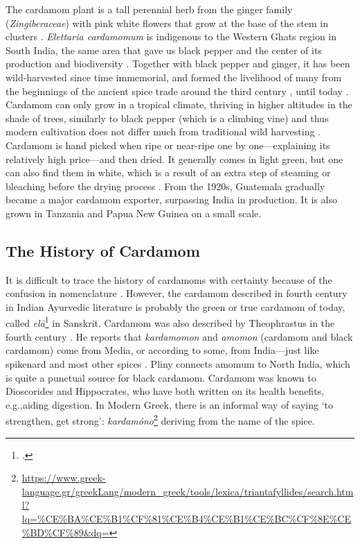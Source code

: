 The cardamom plant is a tall perennial herb from the ginger family (\textit{Zingiberaceae}) with pink white flowers that grow at the base of the stem in clusters \autocite[132]{van_wyk_culinary_2014}. \textit{Elettaria cardamomum} is indigenous to the Western Ghats region in South India, the same area that gave us black pepper and the center of its production and biodiversity \autocite[1]{ravindran_cardamom_2002}. Together with black pepper and ginger, it has been wild-harvested since time immemorial, and formed the livelihood of many from the beginnings of the ancient spice trade around the third century \BC{}, until today \autocite[132]{van_wyk_culinary_2014}. Cardamom can only grow in a tropical climate, thriving in higher altitudes in the shade of trees, similarly to black pepper (which is a climbing vine) and thus modern cultivation does not differ much from traditional wild harvesting \autocite[132]{van_wyk_culinary_2014}. Cardamom is hand picked when ripe or near-ripe one by one---explaining its relatively high price---and then dried. It generally comes in light green, but one can also find them in white, which is a result of an extra step of steaming or bleaching before the drying process \autocite[132]{van_wyk_culinary_2014}. From the 1920s, Guatemala gradually became a major cardamom exporter, surpassing India in production. It is also grown in Tanzania and Papua New Guinea on a small scale.

\subsection{The History of Cardamom}

It is difficult to trace the history of cardamoms with certainty because of the confusion in nomenclature \autocite{cumo_encyclopedia_2013}. However, the cardamom described in fourth century \BC{} in Indian Ayurvedic literature is probably the green or true cardamom of today, called \textit{el\={a}}\footcite[232]{monier-williams_sanskrit-english_1899} in Sanskrit. Cardamom was also described by Theophrastus in the fourth century \BC{}. He reports that \textit{kardamomon} and \textit{amomon} (cardamom and black cardamom) come from Media, or according to some, from India---just like spikenard and most other spices \autocite[249]{theophrastus_enquiry_1916}. Pliny connects amomum to North India, which is quite a punctual source for black cardamom. Cardamom was known to Dioscorides and Hippocrates, who have both written on its health benefits, e.g.,aiding digestion. In Modern Greek, there is an informal way of saying `to strengthen, get strong':  \textit{kardamóno}\footnote{\url{https://www.greek-language.gr/greekLang/modern_greek/tools/lexica/triantafyllides/search.html?lq=\%CE\%BA\%CE\%B1\%CF\%81\%CE\%B4\%CE\%B1\%CE\%BC\%CF\%8E\%CE\%BD\%CF\%89\&dq=}} deriving from the name of the spice.

